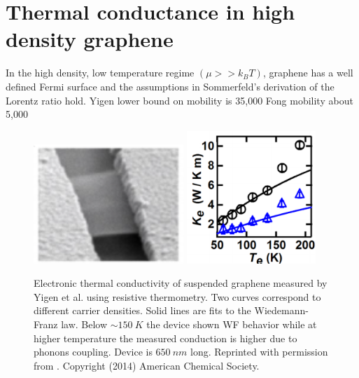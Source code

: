 \chapter{Thermal conductance in high density graphene}
\label{ch:thermal_conductance_in_high_density_graphene}
In the high density, low temperature regime $(\mu >> k_BT)$, graphene has a well defined Fermi surface and the assumptions in Sommerfeld's derivation of the Lorentz ratio hold. 
Yigen lower bound on mobility is 35,000
Fong mobility about 5,000

\begin{figure}
\centering
\includegraphics[height=45mm, valign=t]{figures/high_density_graphene/Yigen_picture.png}
\includegraphics[height=50mm, valign=t]{figures/high_density_graphene/Yigen_Gth.png}
\caption{Electronic thermal conductivity of suspended graphene measured by Yigen et al. using resistive thermometry. Two curves correspond to different carrier densities. Solid lines are fits to the Wiedemann-Franz law. Below ${\sim150}~K$ the device shown WF behavior while at higher temperature the measured conduction is higher due to phonons coupling. Device is $650~nm$ long. Reprinted with permission from \cite{yigen_wiedemannfranz_2014}. Copyright (2014) American Chemical Society.}
\label{fig:Yigen}
\end{figure}


